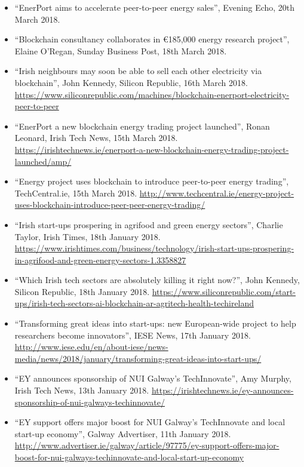 \documentclass[10pt,a4paper]{res} %
\begin{document}
\begin{resume}
{\begin{itemize} \itemsep -2pt
\renewcommand\labelitemi{$\circ$}
\item ``EnerPort aims to accelerate peer-to-peer energy sales'', Evening Echo, 20th March 2018.
\item ``Blockchain consultancy collaborates in \euro{}185,000 energy research project'', Elaine O'Regan, Sunday Business Post, 18th March 2018.
\item ``Irish neighbours may soon be able to sell each other electricity via blockchain'', John Kennedy, Silicon Republic, 16th March 2018. \url{https://www.siliconrepublic.com/machines/blockchain-enerport-electricity-peer-to-peer}
\item ``EnerPort a new blockchain energy trading project launched'', Ronan Leonard, Irish Tech News, 15th March 2018. \url{https://irishtechnews.ie/enerport-a-new-blockchain-energy-trading-project-launched/amp/}
\item ``Energy project uses blockchain to introduce peer-to-peer energy trading'', TechCentral.ie, 15th March 2018. \url{http://www.techcentral.ie/energy-project-uses-blockchain-introduce-peer-peer-energy-trading/}
\item ``Irish start-ups prospering in agrifood and green energy sectors'', Charlie Taylor, Irish Times, 18th January 2018. \url{https://www.irishtimes.com/business/technology/irish-start-ups-prospering-in-agrifood-and-green-energy-sectors-1.3358827}
\item ``Which Irish tech sectors are absolutely killing it right now?'', John Kennedy, Silicon Republic, 18th January 2018. \url{https://www.siliconrepublic.com/start-ups/irish-tech-sectors-ai-blockchain-ar-agritech-health-techireland}
\item ``Transforming great ideas into start-ups: new European-wide project to help researchers become innovators'', IESE News, 17th January 2018. \url{http://www.iese.edu/en/about-iese/news-media/news/2018/january/transforming-great-ideas-into-start-ups/}
\item ``EY announces sponsorship of NUI Galway's TechInnovate'', Amy Murphy, Irish Tech News, 13th January 2018. \url{https://irishtechnews.ie/ey-announces-sponsorship-of-nui-galways-techinnovate/}
\item ``EY support offers major boost for NUI Galway's TechInnovate and local start-up economy'', Galway Advertiser, 11th January 2018. \url{http://www.advertiser.ie/galway/article/97775/ey-support-offers-major-boost-for-nui-galways-techinnovate-and-local-start-up-economy}

\end{itemize}}
\end{resume}
\end{document}
